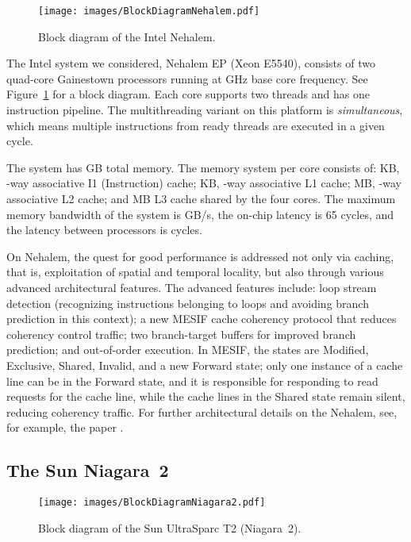 \documentclass{article}
\begin{document}
\begin{figure}
\centering
\texttt{[image: images/BlockDiagramNehalem.pdf]}
\caption{Block diagram of the Intel Nehalem.}
\label{fig:nehalem}
\end{figure}

The Intel system we considered, Nehalem EP (Xeon E5540), consists of two quad-core Gainestown processors 
running at  GHz base core frequency. See Figure~\ref{fig:nehalem} for a block diagram.
Each core supports two threads and has one instruction pipeline.
The multithreading variant on this platform is {\em simultaneous}, 
which means multiple instructions from ready threads are executed in a given cycle. 

The system has  GB total memory. 
The memory system per core  consists of:
 KB, -way associative I1 (Instruction) cache; 
 KB, -way associative L1 cache;
 MB, -way associative L2 cache; and
 MB L3 cache shared by the four cores.
The maximum memory bandwidth of the system is  GB/s, 
the on-chip latency is 65 cycles, and the latency between processors is  cycles. 

On Nehalem, the quest for good performance is addressed not only via caching,
that is, exploitation of  spatial and temporal locality, but also through various 
advanced architectural  features. The advanced features include: loop stream detection 
(recognizing instructions belonging to loops and avoiding branch prediction in this context);   
a new MESIF cache coherency protocol that reduces coherency control traffic; 
two branch-target buffers for improved branch prediction;  and out-of-order execution. 
In MESIF, the states are Modified, Exclusive, Shared, Invalid, and a  new Forward state;  
only one instance of a cache line can be in the Forward state, and it is responsible for 
responding to read requests for the cache line, while the  cache lines  in the 
Shared state  remain silent, reducing coherency traffic.
For further architectural details on the Nehalem, see, for example, the paper \cite{Nehalem1}. 

\subsection{The Sun Niagara~2}
\label{sec:niagara}

\begin{figure}
\centering
\texttt{[image: images/BlockDiagramNiagara2.pdf]}
\caption{Block diagram of the Sun UltraSparc T2 (Niagara~2).} 
\label{fig:niagara}
\end{figure}
\end{document}
